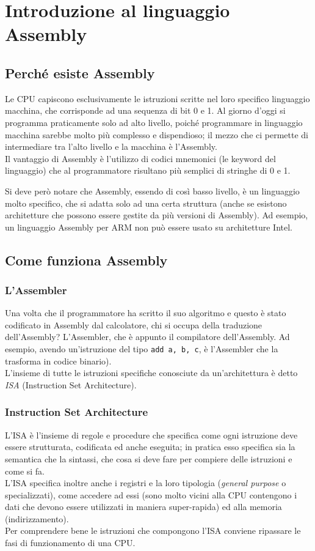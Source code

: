 \documentclass[class=book, crop=false]{standalone}
\begin{document}
\chapter{Introduzione al linguaggio Assembly}

\section{Perché esiste Assembly}

Le CPU capiscono esclusivamente le istruzioni scritte nel loro specifico linguaggio macchina, che corrisponde ad una sequenza di bit 0 e 1.
Al giorno d'oggi si programma praticamente solo ad alto livello, poiché programmare in linguaggio macchina sarebbe molto più complesso e dispendioso; il mezzo che ci permette di intermediare tra l'alto livello e la macchina è l’Assembly.\\
Il vantaggio di Assembly è l'utilizzo di codici mnemonici (le keyword del linguaggio) che al programmatore risultano più semplici di stringhe di 0 e 1.

Si deve però notare che Assembly, essendo di così basso livello, è un linguaggio molto specifico, che si adatta solo ad una certa struttura (anche se esistono architetture che possono essere gestite da più versioni di Assembly). Ad esempio, un linguaggio Assembly per ARM non può essere usato su architetture Intel.

\section{Come funziona Assembly}

\subsection{L'Assembler}
Una volta che il programmatore ha scritto il suo algoritmo e questo è stato codificato in Assembly dal calcolatore, chi si occupa della traduzione dell’Assembly? L’Assembler, che è appunto il compilatore dell’Assembly. Ad esempio, avendo un'istruzione del tipo \texttt{add a, b, c}, è l’Assembler che la trasforma in codice binario).\\
L’insieme di tutte le istruzioni specifiche conosciute da un’architettura è detto \emph{ISA} (Instruction Set Architecture).

\subsection{Instruction Set Architecture}
L’ISA è l'insieme di regole e procedure che specifica come ogni istruzione deve essere strutturata, codificata ed anche eseguita; in pratica esso specifica sia la semantica che la sintassi, che cosa si deve fare per compiere delle istruzioni e come si fa.\\
L’ISA specifica inoltre anche i registri e la loro tipologia (\emph{general purpose} o specializzati), come accedere ad essi (sono molto vicini alla CPU contengono i dati che devono essere utilizzati in maniera super-rapida) ed alla memoria (indirizzamento).\\
Per comprendere bene le istruzioni che compongono l'ISA conviene ripassare le fasi di funzionamento di una CPU.
\end{document}
